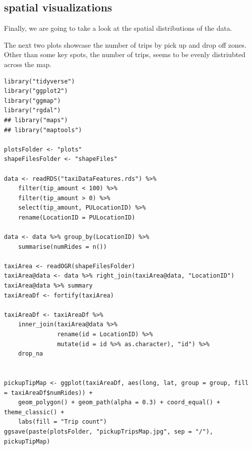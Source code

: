 \documentclass[11pt]{article}
\begin{document}
\subsection{spatial visualizations}
\label{sec:org5f9a8bf}

Finally, we are going to take a look at the spatial distributions of the data.

The next two plots showcase the number of trips by pick up and drop off zones.
Other than some key spots, the number of trips, seems to be evenly distriubted
across the map.

\begin{verbatim}
library("tidyverse")
library("ggplot2")
library("ggmap")
library("rgdal")
## library("maps")
## library("maptools")

plotsFolder <- "plots"
shapeFilesFolder <- "shapeFiles"

data <- readRDS("taxiDataFeatures.rds") %>%
    filter(tip_amount < 100) %>%
    filter(tip_amount > 0) %>%
    select(tip_amount, PULocationID) %>%
    rename(LocationID = PULocationID)

data <- data %>% group_by(LocationID) %>%
    summarise(numRides = n())

taxiArea <- readOGR(shapeFilesFolder)
taxiArea@data <- data %>% right_join(taxiArea@data, "LocationID")
taxiArea@data %>% summary
taxiAreaDf <- fortify(taxiArea)

taxiAreaDf <- taxiAreaDf %>%
    inner_join(taxiArea@data %>%
               rename(id = LocationID) %>%
               mutate(id = id %>% as.character), "id") %>%
    drop_na


pickupTipMap <- ggplot(taxiAreaDf, aes(long, lat, group = group, fill = taxiAreaDf$numRides)) +
    geom_polygon() + geom_path(alpha = 0.3) + coord_equal() + theme_classic() +
    labs(fill = "Trip count")
ggsave(paste(plotsFolder, "pickupTripsMap.jpg", sep = "/"), pickupTipMap)
\end{verbatim}
\end{document}
